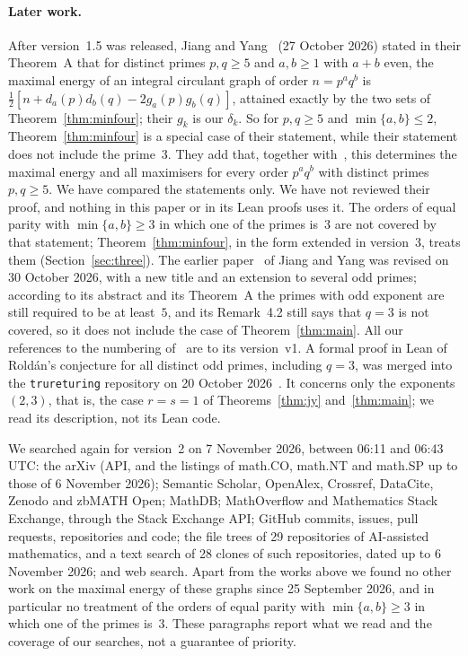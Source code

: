 \documentclass[11pt]{article}
\theoremstyle{remark}
\begin{document}
\paragraph{Later work.} After version~1.5 was released, Jiang and
Yang~\cite{jy2} (27 October 2026) stated in their Theorem~A that for distinct
primes $p,q\ge5$ and $a,b\ge1$ with $a+b$ even, the maximal energy of an integral
circulant graph of order $n=p^aq^b$ is
$\frac12[n+d_a(p)d_b(q)-2g_a(p)g_b(q)]$, attained exactly by the two sets of
Theorem~\ref{thm:minfour}; their $g_k$ is our $\delta_k$. So for $p,q\ge5$ and
$\min\{a,b\}\le2$, Theorem~\ref{thm:minfour} is a special case of their statement,
while their statement does not include the prime~$3$. They add that, together
with~\cite{jy}, this determines the maximal energy and all maximisers for every
order $p^aq^b$ with distinct primes $p,q\ge5$. We have compared the statements only.
We have not reviewed their proof, and nothing in this paper or in its Lean
proofs uses it. The orders of equal parity with $\min\{a,b\}\ge3$ in which one of
the primes is~$3$ are not covered by that statement; Theorem~\ref{thm:minfour}, in
the form extended in version~3, treats them (Section~\ref{sec:three}). The earlier
paper~\cite{jy} of Jiang and Yang was revised on 30 October 2026, with a new title
and an extension to several odd primes; according to its abstract and its Theorem~A
the primes with odd exponent are still required to be at least~$5$, and its
Remark~4.2 still says that $q=3$ is not covered, so it does not include the case of
Theorem~\ref{thm:main}. All our references to the numbering of~\cite{jy} are to its
version~v1. A formal proof in Lean of Rold\'an's conjecture for all distinct odd
primes, including $q=3$, was merged into the \texttt{trureturing} repository on
20 October 2026~\cite{tru2}. It concerns only the exponents $(2,3)$, that is, the
case $r=s=1$ of Theorems~\ref{thm:jy} and~\ref{thm:main}; we read its description,
not its Lean code.

We searched again for version~2 on 7 November 2026, between 06:11 and 06:43 UTC:
the arXiv (API, and the listings of math.CO, math.NT and math.SP up to those of
6 November 2026); Semantic Scholar, OpenAlex, Crossref, DataCite, Zenodo and zbMATH
Open; MathDB; MathOverflow and Mathematics Stack Exchange, through the Stack Exchange
API; GitHub commits, issues, pull requests, repositories and code; the file trees of
29 repositories of AI-assisted mathematics, and a text search of 28 clones of such
repositories, dated up to 6 November 2026; and web search. Apart from the works above
we found no other work on the maximal energy of these graphs since 25 September 2026,
and in particular no treatment of the orders of equal parity with $\min\{a,b\}\ge3$
in which one of the primes is~$3$. These paragraphs report what we read and the
coverage of our searches, not a guarantee of priority.
\end{document}
